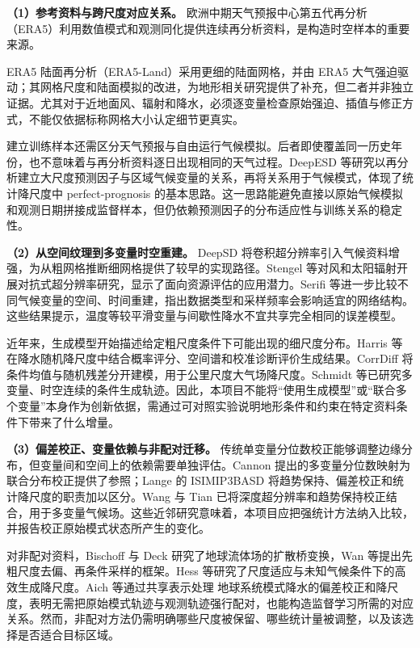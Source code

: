 \textbf{（1）参考资料与跨尺度对应关系。}
欧洲中期天气预报中心第五代再分析（ERA5）利用数值模式和观测同化提供连续再分析资料，是构造时空样本的重要来源\cite{Hersbach2020ERA5}。

ERA5 陆面再分析（ERA5-Land）采用更细的陆面网格，并由 ERA5 大气强迫驱动；其网格尺度和陆面模拟的改进，为地形相关研究提供了补充，但二者并非独立证据\cite{Munoz2021ERA5Land}。尤其对于近地面风、辐射和降水，必须逐变量检查原始强迫、插值与修正方式，不能仅依据标称网格大小认定细节更真实。

建立训练样本还需区分天气预报与自由运行气候模拟。后者即使覆盖同一历史年份，也不意味着与再分析资料逐日出现相同的天气过程。DeepESD 等研究以再分析建立大尺度预测因子与区域气候变量的关系，再将关系用于气候模式，体现了统计降尺度中 perfect-prognosis 的基本思路\cite{Bano2022DeepESD}。这一思路能避免直接以原始气候模拟和观测日期拼接成监督样本，但仍依赖预测因子的分布适应性与训练关系的稳定性。

\textbf{（2）从空间纹理到多变量时空重建。}
DeepSD 将卷积超分辨率引入气候资料增强，为从粗网格推断细网格提供了较早的实现路径\cite{DeepSD2017}。Stengel 等对风和太阳辐射开展对抗式超分辨率研究，显示了面向资源评估的应用潜力\cite{Stengel2020}。Serifi 等进一步比较不同气候变量的空间、时间重建，指出数据类型和采样频率会影响适宜的网络结构\cite{Serifi2021}。这些结果提示，温度等较平滑变量与间歇性降水不宜共享完全相同的误差模型。

近年来，生成模型开始描述给定粗尺度条件下可能出现的细尺度分布。Harris 等在降水随机降尺度中结合概率评分、空间谱和校准诊断评价生成结果\cite{Harris2022}。CorrDiff 将条件均值与随机残差分开建模，用于公里尺度大气场降尺度\cite{Mardani2025CorrDiff}。Schmidt 等已研究多变量、时空连续的条件生成轨迹\cite{Schmidt2025Coherent}。因此，本项目不能将“使用生成模型”或“联合多个变量”本身作为创新依据，需通过可对照实验说明地形条件和约束在特定资料条件下带来了什么增量。

\textbf{（3）偏差校正、变量依赖与非配对迁移。}
传统单变量分位数校正能够调整边缘分布，但变量间和空间上的依赖需要单独评估。Cannon 提出的多变量分位数映射为联合分布校正提供了参照\cite{Cannon2018MBCn}；Lange 的 ISIMIP3BASD 将趋势保持、偏差校正和统计降尺度的职责加以区分\cite{Lange2019ISIMIP}。Wang 与 Tian 已将深度超分辨率和趋势保持校正结合，用于多变量气候场\cite{Trend2024}。这些近邻研究意味着，本项目应把强统计方法纳入比较，并报告校正原始模式状态所产生的变化。

对非配对资料，Bischoff 与 Deck 研究了地球流体场的扩散桥变换\cite{Bischoff2024Unpaired}，Wan 等提出先粗尺度去偏、再条件采样的框架\cite{Wan2023}。Hess 等研究了尺度适应与未知气候条件下的高效生成降尺度\cite{Hess2025Scale}。Aich 等通过共享表示处理 地球系统模式降水的偏差校正和降尺度，表明无需把原始模式轨迹与观测轨迹强行配对，也能构造监督学习所需的对应关系\cite{Aich2026Diffusion}。然而，非配对方法仍需明确哪些尺度被保留、哪些统计量被调整，以及该选择是否适合目标区域。

